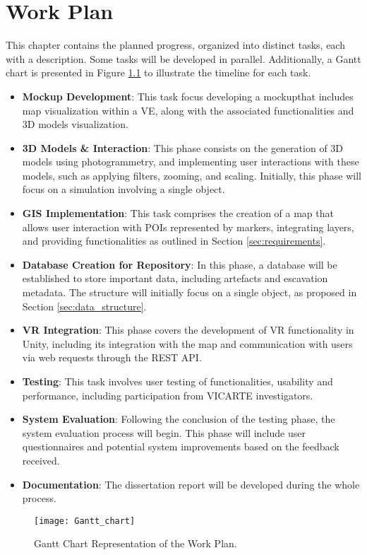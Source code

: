 
%

\chapter{Work Plan}
\label{cha:work_plan}

This chapter contains the planned progress, organized into distinct tasks, each with a description. Some tasks will be developed in parallel. 
Additionally, a Gantt chart is presented in Figure \ref{fig:gantt_chart} to illustrate the timeline for each task.

\begin{itemize}
    \item \textbf{Mockup Development}: This task focus developing a mockupthat includes map visualization within a \gls{VE}, along with the associated functionalities and \gls{3D} models visualization.
    \item \textbf{\gls{3D} Models \& Interaction}: This phase consists on the generation of \gls{3D} models using photogrammetry, and implementing user interactions with these models, such as applying filters, zooming, and scaling.  Initially, this phase will focus on a simulation involving a single object.
    \item \textbf{\gls{GIS} Implementation}: This task comprises the creation of a map that allows user interaction with \glspl{POI} represented by markers, integrating layers, and providing functionalities as outlined in Section \ref{sec:requirements}.
    \item \textbf{Database Creation for Repository}: In this phase, a database will be established to store important data, including artefacts and escavation metadata. The structure will initially focus on a single object, as proposed in Section \ref{sec:data_structure}.
    \item \textbf{\gls{VR} Integration}: This phase covers the development of \gls{VR} functionality in Unity, including its integration with the map and communication with users via web requests through the REST API.
    \item \textbf{Testing}: This task involves user testing of functionalities, usability and performance, including participation from VICARTE investigators.
    \item \textbf{System Evaluation}: Following the conclusion of the testing phase, the system evaluation process will begin. This phase will include user questionnaires and potential system improvements based on the feedback received. 
    \item \textbf{Documentation}: The dissertation report will be developed during the whole process.
\end{itemize}

\begin{figure}[h!]
    \centering
    \texttt{[image: Gantt\_chart]}
    \caption{Gantt Chart Representation of the Work Plan.}
    \label{fig:gantt_chart}
  \end{figure}
  \FloatBarrier